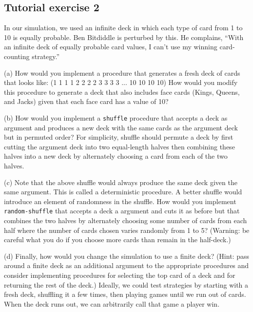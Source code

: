 \subsection{Tutorial exercise 2}

In our simulation, we used an infinite deck in which each type of card
from 1 to 10 is equally probable.  Ben Bitdiddle is perturbed by this.
He complains, ``With an infinite deck of equally probable card values,
I can't use my winning card-counting strategy.''

(a) How would you implement a procedure that generates a fresh deck of
cards that looks like:
\beginlisp
(1 1 1 1 2 2 2 2 3 3 3 3 ... 10 10 10 10)
\endlisp
How would you modify this procedure to generate a deck that also
includes face cards (Kings, Queens, and Jacks) given that each face
card has a value of 10?

(b) How would you implement a {\tt shuffle} procedure that accepts a
deck as argument and produces a new deck with the same cards as the
argument deck but in permuted order?  For simplicity, shuffle should
permute a deck by first cutting the argument deck into two
equal-length halves then combining these halves into a new deck by
alternately choosing a card from each of the two halves.

(c) Note that the above shuffle would always produce the same deck
given the same argument.  This is called a deterministic procedure.  A
better shuffle would introduce an element of randomness in the
shuffle.  How would you implement {\tt random-shuffle} that accepts a
deck a argument and cuts it as before but that combines the two halves
by alternately choosing some number of cards from each half where the
number of cards chosen varies randomly from 1 to 5?  (Warning: be
careful what you do if you choose more cards than remain in the
half-deck.)

(d)  Finally, how would you change the simulation to use a finite deck?
(Hint: pass around a finite deck as an additional argument to the
appropriate procedures and consider implementing procedures for
selecting the top card of a deck and for returning the rest of the
deck.) Ideally, we could test strategies by starting with a fresh
deck, shuffling it a few times, then playing games until we run out of
cards. When the deck runs out, we can arbitrarily call that game a
player win.




